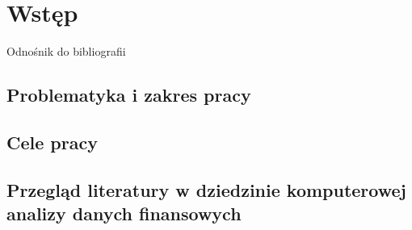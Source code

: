 \chapter{Wstęp}
Odnośnik do bibliografii \cite{warburton1987approximation}
\section{Problematyka i zakres pracy}
\section{Cele pracy}
\section{Przegląd literatury w dziedzinie komputerowej analizy danych finansowych}
